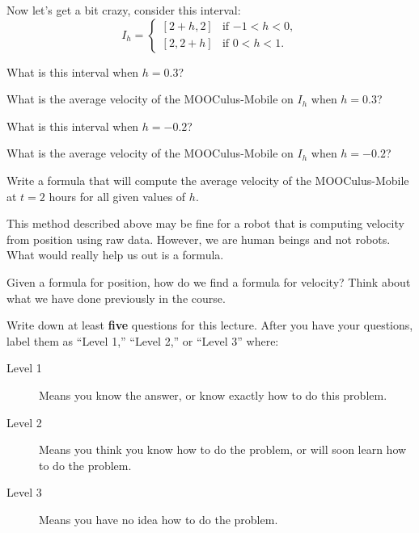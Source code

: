 \documentclass{ximera}
\begin{document}
Now let's get a bit crazy, consider this interval:
\[
I_h = 
\begin{cases}
[2+h,2]  & \text{if $-1<h<0$}, \\ %
[2,2+h]  & \text{if $0<h<1$}.     %
\end{cases}
\]

\begin{question}
What is this interval when $h = 0.3$?
\end{question}

\begin{question}
What is the average velocity of the MOOCulus-Mobile on $I_h$ when $h =
0.3$?
\end{question}

\begin{question}
What is this interval when $h = -0.2$?
\end{question}

\begin{question}
What is the average velocity of the MOOCulus-Mobile on $I_h$ when $h =
-0.2$?
\end{question}

\begin{question}
Write a formula that will compute the average velocity of the
MOOCulus-Mobile at $t=2$ hours for all given values of $h$.
\end{question}

This method described above may be fine for a robot that is computing
velocity from position using raw data. However, we are human beings
and not robots. What would really help us out is a formula. 

\begin{question}
Given a formula for position, how do we find a formula for velocity?
Think about what we have done previously in the course. 
\end{question}

\begin{xarmaBoost}
Write down at least \textbf{five} questions for this lecture. After
you have your questions, label them as ``Level 1,'' ``Level 2,'' or ``Level 3'' where:
\begin{description}
\item[Level 1] Means you know the answer, or know exactly how to do
  this problem.
\item[Level 2] Means you think you know how to do the problem, or will
  soon learn how to do the problem.
\item[Level 3] Means you have no idea how to do the problem.
\end{description}
  \begin{freeResponse}
  \end{freeResponse}
\end{xarmaBoost}
\end{document}
